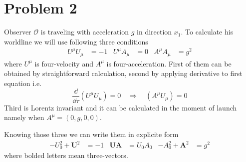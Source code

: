 \section*{Problem 2}

Observer $\mathcal{O}$ is traveling with acceleration $g$ in direction $x_1$. To
calculate his worldline we will use following three conditions
%
\begin{align}
	U^\mu U_\mu & = -1 & U^\mu A_\mu & = 0 & A^\mu A_\mu & = g^2
\end{align}
%
where $U^\mu$ is four-velocity and $A^\mu$ is four-acceleration. First of them
can be obtained by straightforward calculation, second by applying derivative
to first equation i.e.
%
\begin{equation}
	\frac{\dd}{\dd \tau} \left(U^\mu U_\mu\right) = 0 \quad \Rightarrow \quad \left(A^\mu U_\mu\right) = 0
\end{equation}
%
Third is Lorentz invariant and it can be calculated in the moment of launch
namely when $A^\mu=(0,g,0,0)$.

Knowing those three we can write them in explicite form
\begin{align}
	-U_0^2 + \boldsymbol{U}^2    & = -1      &
	\boldsymbol{U}\boldsymbol{A} & = U_0 A_0 &
	-A_0^2 + \boldsymbol{A}^2    & = g^2
\end{align}
%
where bolded letters mean three-vectors.

